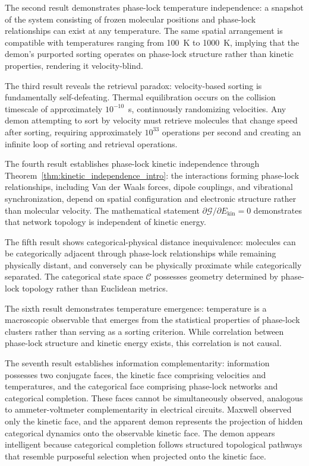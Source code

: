 \documentclass[12pt,a4paper]{article}
\theoremstyle{definition}
\theoremstyle{remark}
\newcommand{\phaselockgraph}{\mathcal{G}}
\newcommand{\catspace}{\mathcal{C}}
\begin{document}
The second result demonstrates phase-lock temperature independence: a snapshot of the system consisting of frozen molecular positions and phase-lock relationships can exist at any temperature. The same spatial arrangement is compatible with temperatures ranging from 100~K to 1000~K, implying that the demon's purported sorting operates on phase-lock structure rather than kinetic properties, rendering it velocity-blind.

The third result reveals the retrieval paradox: velocity-based sorting is fundamentally self-defeating. Thermal equilibration occurs on the collision timescale of approximately $10^{-10}$~s, continuously randomizing velocities. Any demon attempting to sort by velocity must retrieve molecules that change speed after sorting, requiring approximately $10^{33}$ operations per second and creating an infinite loop of sorting and retrieval operations.

The fourth result establishes phase-lock kinetic independence through Theorem~\ref{thm:kinetic_independence_intro}: the interactions forming phase-lock relationships, including Van der Waals forces, dipole couplings, and vibrational synchronization, depend on spatial configuration and electronic structure rather than molecular velocity. The mathematical statement $\partial \phaselockgraph / \partial E_{\text{kin}} = 0$ demonstrates that network topology is independent of kinetic energy.

The fifth result shows categorical-physical distance inequivalence: molecules can be categorically adjacent through phase-lock relationships while remaining physically distant, and conversely can be physically proximate while categorically separated. The categorical state space $\catspace$ possesses geometry determined by phase-lock topology rather than Euclidean metrics.

The sixth result demonstrates temperature emergence: temperature is a macroscopic observable that emerges from the statistical properties of phase-lock clusters rather than serving as a sorting criterion. While correlation between phase-lock structure and kinetic energy exists, this correlation is not causal.

The seventh result establishes information complementarity: information possesses two conjugate faces, the kinetic face comprising velocities and temperatures, and the categorical face comprising phase-lock networks and categorical completion. These faces cannot be simultaneously observed, analogous to ammeter-voltmeter complementarity in electrical circuits. Maxwell observed only the kinetic face, and the apparent demon represents the projection of hidden categorical dynamics onto the observable kinetic face. The demon appears intelligent because categorical completion follows structured topological pathways that resemble purposeful selection when projected onto the kinetic face.
\end{document}

